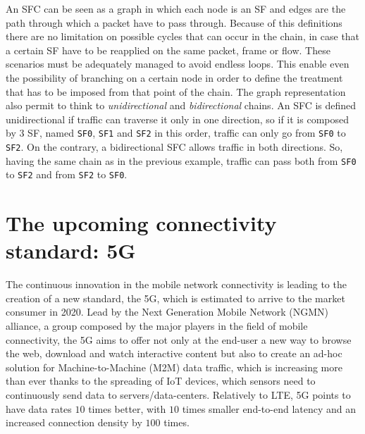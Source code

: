 An SFC can be seen as a graph in which each node is an SF and edges are the path through which a packet have to pass through. Because of this definitions there are no limitation on possible cycles that can occur in the chain, in case that a certain SF have to be reapplied on the same packet, frame or flow. These scenarios must be adequately managed to avoid endless loops. This enable even the possibility of branching on a certain node in order to define the treatment that has to be imposed from that point of the chain. The graph representation also permit to think to \emph{unidirectional} and \emph{bidirectional} chains. An SFC is defined unidirectional if traffic can traverse it only in one direction, so if it is composed by 3 SF, named \texttt{SF0}, \texttt{SF1} and \texttt{SF2} in this order, traffic can only go from \texttt{SF0} to \texttt{SF2}. On the contrary, a bidirectional SFC allows traffic in both directions. So, having the same chain as in the previous example, traffic can pass both from \texttt{SF0} to \texttt{SF2} and from \texttt{SF2} to \texttt{SF0}.



\section{The upcoming connectivity standard: 5G}
The continuous innovation in the mobile network connectivity is leading to the
creation of a new standard, the 5G, which is estimated to arrive to the market
consumer in 2020. Lead by the Next Generation Mobile Network (NGMN)
alliance, a group composed by the major players in the field of mobile
connectivity, the 5G aims to offer not only at the end-user a new way to browse 
the web, download and watch interactive content but also to create an ad-hoc 
solution for Machine-to-Machine (M2M) data traffic, which is increasing more 
than ever thanks to the spreading of IoT devices, which sensors need to 
continuously send data to servers/data-centers. Relatively to LTE, 5G points to have data rates $10$ times better, with $10$ times 
smaller end-to-end latency and an increased connection density by $100$ 
times.

